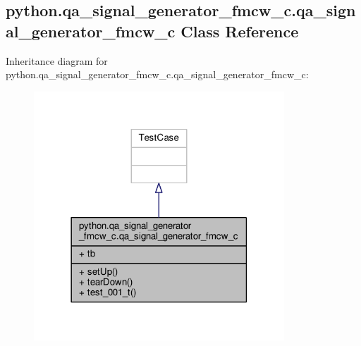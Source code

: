\subsection{python.\+qa\+\_\+signal\+\_\+generator\+\_\+fmcw\+\_\+c.\+qa\+\_\+signal\+\_\+generator\+\_\+fmcw\+\_\+c Class Reference}
\label{classpython_1_1qa__signal__generator__fmcw__c_1_1qa__signal__generator__fmcw__c}


Inheritance diagram for python.\+qa\+\_\+signal\+\_\+generator\+\_\+fmcw\+\_\+c.\+qa\+\_\+signal\+\_\+generator\+\_\+fmcw\+\_\+c\+:
\nopagebreak
\begin{figure}[H]
\begin{center}
\leavevmode
\includegraphics[width=266pt]{db/db1/classpython_1_1qa__signal__generator__fmcw__c_1_1qa__signal__generator__fmcw__c__inherit__graph}
\end{center}
\end{figure}


